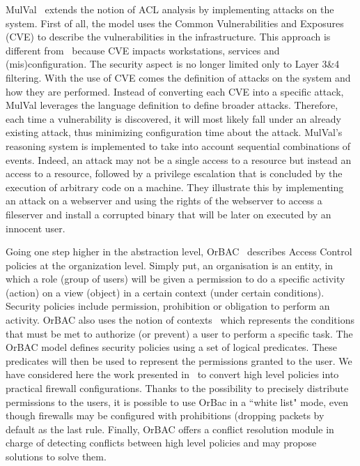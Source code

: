 MulVal~\cite{mulval-Ou2013} extends the notion of ACL analysis by implementing attacks on the system. First of all, the model uses the Common Vulnerabilities and Exposures (CVE) to describe the vulnerabilities in the infrastructure. This approach is different from~\cite{Matousek2008} because CVE impacts workstations, services and (mis)configuration. The security aspect is no longer limited only to Layer 3\&4 filtering.
With the use of CVE comes the definition of attacks on the system and how they are performed.
Instead of converting each CVE into a specific attack, MulVal leverages the language definition to define broader attacks.
Therefore, each time a vulnerability is discovered, it will most likely fall under an already existing attack, thus minimizing configuration time about the attack.
MulVal's reasoning system is implemented to take into account sequential combinations of events.
Indeed, an attack may not be a single access to a resource but instead an access to a resource, followed by a privilege escalation that is concluded by the execution of arbitrary code on a machine.
They illustrate this by implementing an attack on a webserver and using the rights of the webserver to access a fileserver and install a corrupted binary that will be later on executed by an innocent user.

Going one step higher in the abstraction level, OrBAC~\cite{orbac} describes Access Control policies at the organization level. Simply put, an organisation is an entity, in which a role (\ie group of users) will be given a permission to do a specific activity (\ie action) on a view (\ie object) in a certain context (\ie under certain conditions).
Security policies include permission, prohibition or obligation to perform an activity.
OrBAC also uses the notion of contexts~\cite{context-orbac} which represents the conditions that must be met to authorize (or prevent) a user to perform a specific task.
The OrBAC model defines security policies using a set of logical predicates. These predicates will then be used to represent the permissions granted to the user.
We have considered here the work presented in~\cite{Cuppens} to convert high level policies into practical firewall configurations. Thanks to the possibility to precisely distribute permissions to the users, it is possible to use OrBac in a ``white list" mode, even though firewalls may be configured with prohibitions (\ie dropping packets by default as the last rule.
Finally, OrBAC offers a conflict resolution module in charge of detecting conflicts between high level policies and may propose solutions to solve them.

